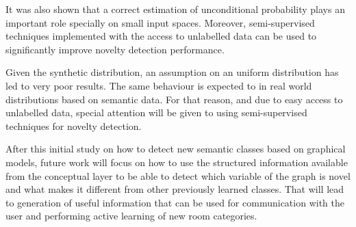 \documentclass[runningheads,a4paper]{llncs}
\begin{document}
It was also shown that a correct estimation of unconditional probability plays an
important role specially on small input spaces. Moreover, semi-supervised techniques
implemented with the access to unlabelled data can be used to significantly improve
novelty detection performance.

Given the synthetic distribution, an assumption on an uniform
distribution has led to very poor results. The same behaviour is expected to
in real world distributions based on semantic data. For that reason,
and due to easy access to unlabelled data, special attention will be given to using
semi-supervised techniques for novelty detection.

After this initial study on how to detect new semantic classes based on
graphical models, future work will focus on how to use the structured
information available from the conceptual layer to be able to detect which variable
of the graph is novel and what makes it different from other previously learned
classes. That will lead to generation of useful information that can be used for
communication with the user and performing active learning of new room categories.




\end{document}
